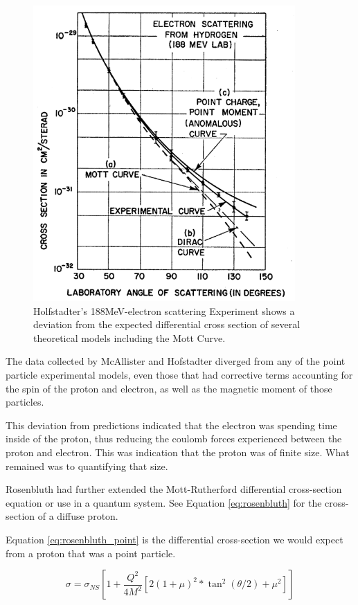 \documentclass[12pt]{article}
\begin{document}
\begin{figure}
    \centering
    \includegraphics[width = 10cm]{mott_dirac_188mev}
    \caption{Holfstadter's 188MeV-electron scattering Experiment shows a deviation from the expected differential cross section of several theoretical models including the Mott Curve.}
    \label{fig:ruthenergy}
\end{figure}

The data collected by McAllister and Hofstadter diverged from any of the point particle experimental models, even those that had corrective terms accounting for the spin of the proton and electron, as well as the magnetic moment of those particles.

This deviation from predictions indicated that the electron was spending time inside of the proton, thus reducing the coulomb forces experienced between the proton and electron.
This was indication that the proton was of finite size.
What remained was to quantifying that size.

Rosenbluth had further extended the Mott-Rutherford differential cross-section equation or use in a quantum system. See Equation \ref{eq:rosenbluth} for the cross-section of a diffuse proton\cite{McAllister1956}.

Equation \ref{eq:rosenbluth_point} is the differential cross-section we would expect from a proton that was a point particle. 

\begin{equation}\label{eq:rosenbluth_point}
\sigma = \sigma_{NS}[1 + \frac{Q^2}{4M^2}[2(1+\mu)^2*\tan^2(\theta/2)+\mu^2]]
\end{equation}
\end{document}
